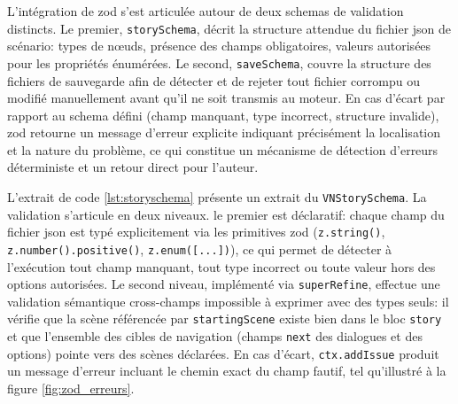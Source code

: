 L'intégration de \gls{zod} s'est articulée autour de deux \glspl{schema} de validation distincts. Le premier, \texttt{storySchema}, décrit la structure attendue du fichier \acrshort{json} de scénario: types de n\oe{}uds, présence des champs obligatoires, valeurs autorisées pour les propriétés énumérées. Le second, \texttt{saveSchema}, couvre la structure des fichiers de sauvegarde afin de détecter et de rejeter tout fichier corrompu ou modifié manuellement avant qu'il ne soit transmis au moteur. En cas d'écart par rapport au \gls{schema} défini (champ manquant, type incorrect, structure invalide), \gls{zod} retourne un message d'erreur explicite indiquant précisément la localisation et la nature du problème, ce qui constitue un mécanisme de détection d'erreurs déterministe et un retour direct pour l'auteur.

L'extrait de code \ref{lst:storyschema} présente un extrait du \texttt{VNStorySchema}. La validation s'articule en deux niveaux. le premier est déclaratif: chaque champ du fichier \gls{json} est typé explicitement via les primitives \gls{zod} (\texttt{z.string()}, \texttt{z.number().positive()}, \texttt{z.enum([...])}), ce qui permet de détecter à l'exécution tout champ manquant, tout type incorrect ou toute valeur hors des options autorisées. Le second niveau, implémenté via \texttt{superRefine}, effectue une validation sémantique cross-champs impossible à exprimer avec des types seuls: il vérifie que la scène référencée par \texttt{startingScene} existe bien dans le bloc \texttt{story} et que l'ensemble des cibles de navigation (champs \texttt{next} des dialogues et des options) pointe vers des scènes déclarées. En cas d'écart, \texttt{ctx.addIssue} produit un message d'erreur incluant le chemin exact du champ fautif, tel qu'illustré à la figure \ref{fig:zod_erreurs}.

